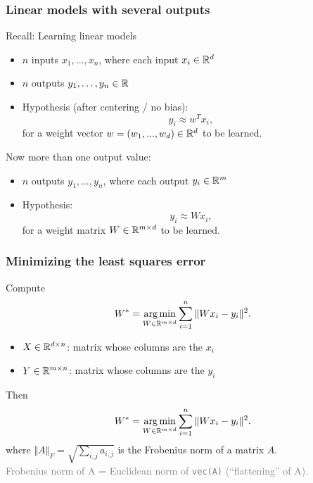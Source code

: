 \documentclass[aspectratio=149]{beamer}
\begin{document}
\begin{frame}
  \frametitle{Linear models with several outputs}
  Recall: Learning linear models
  \begin{itemize}
    \item $n$ inputs $x_1,\dots,x_n$, where each input $x_i \in \mathbb{R}^d$
    \item $n$ outputs $y_1,\dots,y_n \in \mathbb{R}$
    \item Hypothesis (after centering / no bias):
          \begin{equation}
            y_i \approx w^T x_i ,
          \end{equation}
          for a weight vector $w = (w_1,...,w_d) \in \mathbb{R}^d$ to be learned.
  \end{itemize}

  Now more than one output value:
  \begin{itemize}
    \item $n$ outputs $y_1,\dots,y_n$, where each output $y_i \in \mathbb{R}^m$
    \item Hypothesis:
          \begin{equation}
            y_i \approx W x_i,
          \end{equation}
          for a weight matrix $W \in \mathbb{R}^{m\times d}$ to be learned.
  \end{itemize}
\end{frame}


\begin{frame}
  \frametitle{Minimizing the least squares error}

  Compute
  \begin{equation}
    W^* = \operatorname*{arg\,min}_{W\in \mathbb{R}^{m\times d}} \sum_{i=1}^{n} \Vert W x_i - y_i \Vert^2.
  \end{equation}

  \begin{itemize}
    \item $X \in \mathbb{R}^{d \times n}$: matrix whose columns are the $x_i$
    \item $Y \in \mathbb{R}^{m \times n}$: matrix whose columns are the $y_i$
  \end{itemize}
  Then
  \begin{equation}
    W^* = \operatorname*{arg\,min}_{W\in \mathbb{R}^{m\times d}} \sum_{i=1}^{n} \Vert W x_i - y_i \Vert^2.
  \end{equation}
  where $\Vert A \Vert_F = \sqrt{\sum_{i,j} a_{i,j}}$ is the Frobenius norm of a matrix $A$.\\
  \textcolor{gray}{Frobenius norm of A = Euclidean norm of \texttt{vec(A)} (``flattening'' of A).}

\end{frame}
\end{document}
